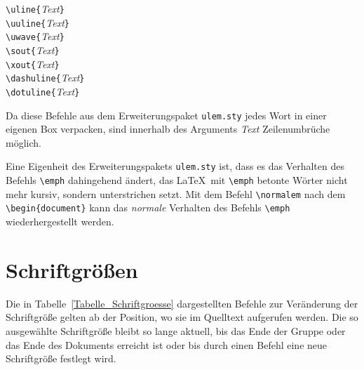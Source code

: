 \documentclass[a4paper,10pt,twoside]{scrbook}
\begin{document}
\begin{boxedminipage}{\textwidth}
\texttt{\textbackslash uline\{}\textsl{Text}\texttt{\}} \\
\texttt{\textbackslash uuline\{}\textsl{Text}\texttt{\}} \\
\texttt{\textbackslash uwave\{}\textsl{Text}\texttt{\}} \\
\texttt{\textbackslash sout\{}\textsl{Text}\texttt{\}} \\
\texttt{\textbackslash xout\{}\textsl{Text}\texttt{\}} \\
\texttt{\textbackslash dashuline\{}\textsl{Text}\texttt{\}} \\
\texttt{\textbackslash dotuline\{}\textsl{Text}\texttt{\}} 
\end{boxedminipage}




Da diese Befehle aus dem Erweiterungspaket \verb!ulem.sty! jedes Wort in einer eigenen Box verpacken, sind innerhalb des  Arguments \textsl{Text} Zeilenumbrüche möglich.

Eine Eigenheit des Erweiterungspakets \verb!ulem.sty! ist, dass es das Verhalten des Befehls \verb!\emph! dahingehend ändert, das \LaTeX\ mit \verb!\emph! betonte Wörter nicht mehr kursiv, sondern unterstrichen setzt. Mit dem Befehl \verb!\normalem! nach dem \verb!\begin{document}! kann das \emph{normale} Verhalten des Befehls \verb!\emph! wiederhergestellt werden.

\section{Schriftgrößen}

Die in Tabelle~\ref{Tabelle_Schriftgroesse} dargestellten Befehle zur Veränderung der Schriftgröße gelten ab der Position, wo sie im Quelltext aufgerufen werden. Die so ausgewählte Schriftgröße bleibt so lange aktuell, bis das 
Ende der Gruppe oder das Ende des Dokuments erreicht ist oder bis durch einen Befehl
eine neue Schriftgröße festlegt wird.
\end{document}
